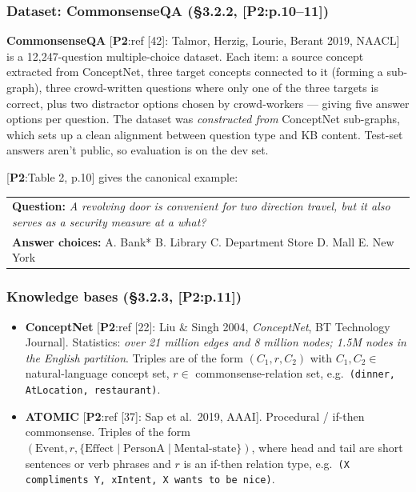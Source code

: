 \documentclass[11pt, a4paper]{article}
\newcommand{\paperref}[1]{\textcolor{srcBd}{\small[\textbf{P2}:#1]}}
\begin{document}
\subsubsection*{Dataset: CommonsenseQA (§3.2.2, \paperref{p.10--11})}
\textbf{CommonsenseQA} \paperref{ref [42]: Talmor, Herzig, Lourie, Berant 2019, NAACL} is a 12{,}247-question multiple-choice dataset. Each item: a source concept extracted from ConceptNet, three target concepts connected to it (forming a sub-graph), three crowd-written questions where only one of the three targets is correct, plus two distractor options chosen by crowd-workers — giving five answer options per question. The dataset was \emph{constructed from} ConceptNet sub-graphs, which sets up a clean alignment between question type and KB content. Test-set answers aren't public, so evaluation is on the dev set.

\paperref{Table 2, p.10} gives the canonical example:
\begin{center}\small
\begin{tabular}{p{}}
\toprule
\textbf{Question:} \emph{A revolving door is convenient for two direction travel, but it also serves as a security measure at a what?}\\
\textbf{Answer choices:} A. Bank* \quad B. Library \quad C. Department Store \quad D. Mall \quad E. New York\\
\bottomrule
\end{tabular}
\end{center}

\subsubsection*{Knowledge bases (§3.2.3, \paperref{p.11})}
\begin{itemize}
  \item \textbf{ConceptNet} \paperref{ref [22]: Liu \& Singh 2004, \emph{ConceptNet}, BT Technology Journal}. Statistics: \emph{over 21 million edges and 8 million nodes; 1.5M nodes in the English partition}. Triples are of the form \((C_1, r, C_2)\) with \(C_1, C_2 \in\) natural-language concept set, \(r \in\) commonsense-relation set, e.g.\ \texttt{(dinner, AtLocation, restaurant)}.
  \item \textbf{ATOMIC} \paperref{ref [37]: Sap et al.\ 2019, AAAI}. Procedural / if-then commonsense. Triples of the form \((\mathrm{Event}, r, \{\mathrm{Effect} \mid \mathrm{PersonA} \mid \mathrm{Mental\text{-}state}\})\), where head and tail are short sentences or verb phrases and \(r\) is an if-then relation type, e.g.\ \texttt{(X compliments Y, xIntent, X wants to be nice)}.
\end{itemize}
\end{document}
